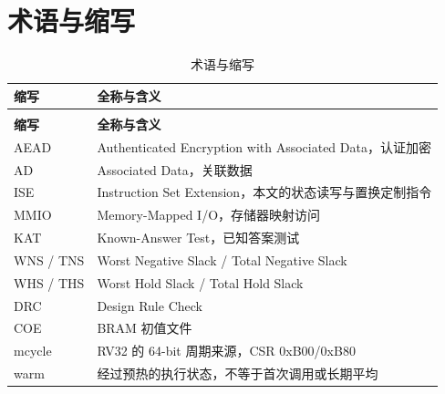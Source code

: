 \chapter{术语与缩写}
\renewcommand{\thesubsection}{\thechapter.\arabic{subsection}}

{\small
\setlength{\tabcolsep}{4pt}
\renewcommand{\thetable}{A-1}
\begin{longtable}{@{}>{\raggedright\arraybackslash}p{}>{\raggedright\arraybackslash}p{}@{}}
\caption{术语与缩写}\label{tab:A-1}\\
\toprule
\textbf{缩写} & \textbf{全称与含义} \\
\midrule
\endfirsthead
\multicolumn{2}{@{}l}{\footnotesize 续表 A-1}\\
\toprule
\textbf{缩写} & \textbf{全称与含义} \\
\midrule
\endhead
AEAD & Authenticated Encryption with Associated Data，认证加密 \\
AD & Associated Data，关联数据 \\
ISE & Instruction Set Extension，本文的状态读写与置换定制指令 \\
MMIO & Memory-Mapped I/O，存储器映射访问 \\
KAT & Known-Answer Test，已知答案测试 \\
WNS / TNS & Worst Negative Slack / Total Negative Slack \\
WHS / THS & Worst Hold Slack / Total Hold Slack \\
DRC & Design Rule Check \\
COE & BRAM 初值文件 \\
mcycle & RV32 的 64-bit 周期来源，CSR 0xB00/0xB80 \\
warm & 经过预热的执行状态，不等于首次调用或长期平均 \\
\bottomrule
\end{longtable}
}
